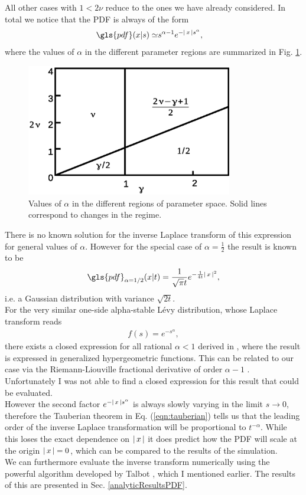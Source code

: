All other cases with $1< 2\nu$ reduce to the ones we have already considered. In total we notice that the \gls{PDF} is always of the form 
%
\begin{align}
\gls{pdf}(x|s)\simeq & s^{\alpha-1} e^{-\abs{x} s^{\alpha}} ,
\end{align}
%
where the values of $\alpha$ in the different parameter regions are summarized in Fig. \ref{fig:alphaValuesPDF}.
%
\begin{figure}[h!]
\begin{center}
\includegraphics[width=90mm]{pics/alphaValuesPDF.eps}
\caption{Values of $\alpha$ in the different regions of parameter space. Solid lines correspond to changes in the regime.
\label{fig:alphaValuesPDF} }
\end{center}
\end{figure} 
%
There is no known solution for the inverse Laplace transform of this expression for general values of $\alpha$. However for the special case of $\alpha = \frac{1}{2} $ the result is known to be
%
\begin{align}
\gls{pdf}_{\alpha=1/2}(x|t) = \frac{1}{\sqrt{\pi}t}e^{-\frac{1}{4t}\abs{x}^2} ,
\end{align}
%
i.e. a Gaussian distribution with variance $\sqrt{2t}$. \\

For the very similar one-side alpha-stable L\'evy distribution, whose Laplace transform reads
%
\begin{align}
f(s) = e^{-s^{\alpha}},
\end{align}
%
there exists a closed expression for all rational $\alpha<1$ derived in \cite{penson2010}, where the result is expressed in generalized hypergeometric functions. This can be related to our case via the Riemann-Liouville fractional derivative of order $\alpha-1$ \cite{mathai2009}. Unfortunately I was not able to find a closed expression for this result that could be evaluated.\\
However the second factor $e^{-\left|\,x\,\right|s^{\alpha}}$ is always slowly varying in the limit $s \to 0$, therefore the Tauberian theorem in Eq. (\ref{eqn:tauberian}) tells us that the leading order of the inverse Laplace transformation will be proportional to $t^{-\alpha}$. While this loses the exact dependence on $\left|\,x\,\right|$ it does predict how the \gls{PDF} will scale at the origin $\left|\,x\,\right|=0$, which can be compared to the results of the simulation.\\

We can furthermore evaluate the inverse transform numerically using the powerful algorithm developed by Talbot \cite{talbot1979}, which I mentioned earlier. The results of this are presented in Sec. \ref{analyticResultsPDF}.